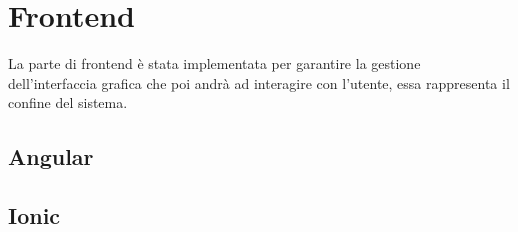 \documentclass{article}
\begin{document}
\section{Frontend}
La parte di frontend è stata implementata per garantire la gestione dell'interfaccia grafica che poi andrà ad interagire con l'utente, essa rappresenta il confine del sistema.

\subsection{Angular}

\subsection{Ionic}



\nocite{*}
\printbibliography[heading = bibintoc]
\end{document}
